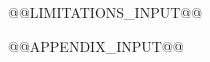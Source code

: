 \documentclass[11pt]{article}
\title{}
\begin{document}
\maketitle

\begin{abstract}

\end{abstract}



\label{content-end}

@@LIMITATIONS_INPUT@@

\label{refs-start}

\makeatletter
{}
\makeatother
\label{document-end}

@@APPENDIX_INPUT@@
\end{document}
